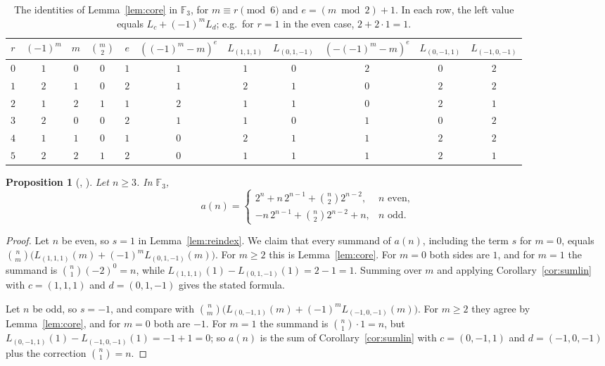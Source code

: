 \documentclass[11pt]{amsart}
\theoremstyle{plain}
\newtheorem{proposition}[theorem]{Proposition}
\theoremstyle{definition}
\newcommand{\F}{\mathbb{F}}
\begin{document}
\begin{table}[b]
\centering\footnotesize\setlength{\tabcolsep}{4.5pt}
\begin{tabular}{c|cccc|ccc|ccc}
\toprule
$r$ & $(-1)^m$ & $m$ & $\binom m2$ & $e$ & $((-1)^m-m)^e$ & $L_{(1,1,1)}$ & $L_{(0,1,-1)}$ & $(-(-1)^m-m)^e$ & $L_{(0,-1,1)}$ & $L_{(-1,0,-1)}$\\
\midrule
$0$ & $1$ & $0$ & $0$ & $1$ & $1$ & $1$ & $0$ & $2$ & $0$ & $2$\\
$1$ & $2$ & $1$ & $0$ & $2$ & $1$ & $2$ & $1$ & $0$ & $2$ & $2$\\
$2$ & $1$ & $2$ & $1$ & $1$ & $2$ & $1$ & $1$ & $0$ & $2$ & $1$\\
$3$ & $2$ & $0$ & $0$ & $2$ & $1$ & $1$ & $0$ & $1$ & $0$ & $2$\\
$4$ & $1$ & $1$ & $0$ & $1$ & $0$ & $2$ & $1$ & $1$ & $2$ & $2$\\
$5$ & $2$ & $2$ & $1$ & $2$ & $0$ & $1$ & $1$ & $1$ & $2$ & $1$\\
\bottomrule
\end{tabular}
\caption{The identities of Lemma~\ref{lem:core} in $\F_3$, for $m\equiv r\pmod 6$ and $e=(m\bmod 2)+1$. In each row, the left value equals $L_c+(-1)^mL_d$; e.g.\ for $r=1$ in the even case, $2+2\cdot1=1$.}
\label{tab:core}
\end{table}

\begin{proposition}[, ]\label{prop:closed}
Let $n\ge3$. In $\F_3$,
\[
  a(n)=\begin{cases}
  2^n+n\,2^{n-1}+\binom n2 2^{n-2}, & n\text{ even},\\[2pt]
  -n\,2^{n-1}+\binom n22^{n-2}+n, & n\text{ odd}.
  \end{cases}
\]
\end{proposition}

\begin{proof}
Let $n$ be even, so $s=1$ in Lemma~\ref{lem:reindex}. We claim that every summand of $a(n)$, including the term $s$ for $m=0$, equals $\binom nm\bigl(L_{(1,1,1)}(m)+(-1)^mL_{(0,1,-1)}(m)\bigr)$.
For $m\ge2$ this is Lemma~\ref{lem:core}.
For $m=0$ both sides are $1$, and for $m=1$ the summand is $\binom n1(-2)^0=n$, while $L_{(1,1,1)}(1)-L_{(0,1,-1)}(1)=2-1=1$.
Summing over $m$ and applying Corollary~\ref{cor:sumlin} with $c=(1,1,1)$ and $d=(0,1,-1)$ gives the stated formula.

Let $n$ be odd, so $s=-1$, and compare with $\binom nm\bigl(L_{(0,-1,1)}(m)+(-1)^mL_{(-1,0,-1)}(m)\bigr)$.
For $m\ge2$ they agree by Lemma~\ref{lem:core}, and for $m=0$ both are $-1$.
For $m=1$ the summand is $\binom n1\cdot1=n$, but $L_{(0,-1,1)}(1)-L_{(-1,0,-1)}(1)=-1+1=0$; so $a(n)$ is the sum of Corollary~\ref{cor:sumlin} with $c=(0,-1,1)$ and $d=(-1,0,-1)$ plus the correction $\binom n1=n$.
\end{proof}
\end{document}
